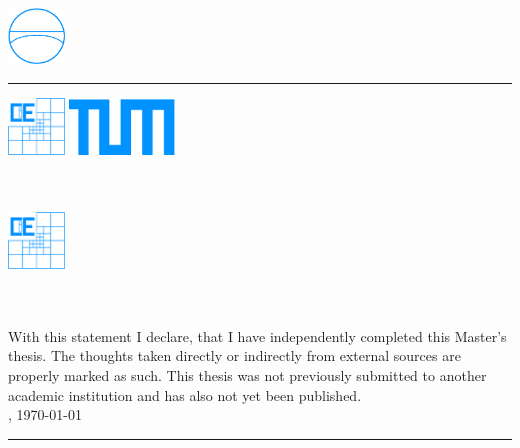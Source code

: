 \ \\[-1cm]
\includegraphics[height=1.5cm]{./pictures/Logos/bauiverm_blau_cut}
\rule{5mm}{0pt}
\includegraphics[height=1.5cm]{./pictures/Logos/CiE-Logo}
\hfill
\includegraphics[height=1.5cm]{./pictures/Logos/TUMLogo_oZ_Vollfl_blau_RGB}
\\
\ \\[4ex]
\singlespacing\noindent%
{}\\[5ex]
\parbox[c]{2.5cm}{\includegraphics[height=1.5cm]{./pictures/Logos/CiE-Logo}}
\parbox[c]{13.5cm}{\AdresseLehrstuhl}
\\[10ex]
{}\\[5ex]
With this statement I declare, that I have independently completed this Master's
thesis. The thoughts taken directly or indirectly from external sources are
properly marked as such. This thesis was not previously submitted to another
academic institution and has also not yet been published. \\[3ex]
\DAort, \today\\[-4ex]
\begin{flushright}{\rule{7cm}{0.5pt}}\\{\footnotesize{\DAautor}}\end{flushright}
\ \\\vfill\noindent
\DAautor\\
\DAautorAnschrift
\cleardoublepage
